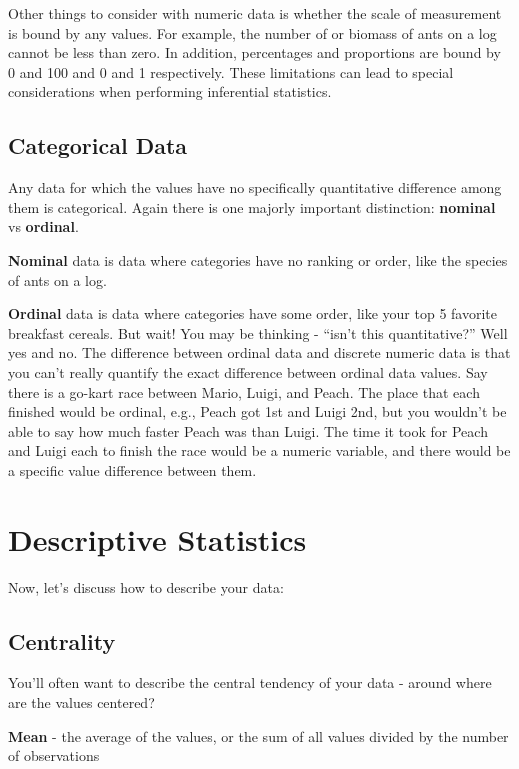 \documentclass[
  letterpaper,
  DIV=11,
  numbers=noendperiod]{scrreprt}
\begin{document}
Other things to consider with numeric data is whether the scale of
measurement is bound by any values. For example, the number of or
biomass of ants on a log cannot be less than zero. In addition,
percentages and proportions are bound by 0 and 100 and 0 and 1
respectively. These limitations can lead to special considerations when
performing inferential statistics.

\section{Categorical Data}\label{categorical-data}

Any data for which the values have no specifically quantitative
difference among them is categorical. Again there is one majorly
important distinction: \textbf{nominal} vs \textbf{ordinal}.

\textbf{Nominal} data is data where categories have no ranking or order,
like the species of ants on a log.

\textbf{Ordinal} data is data where categories have some order, like
your top 5 favorite breakfast cereals. But wait! You may be thinking -
``isn't this quantitative?'' Well yes and no. The difference between
ordinal data and discrete numeric data is that you can't really quantify
the exact difference between ordinal data values. Say there is a go-kart
race between Mario, Luigi, and Peach. The place that each finished would
be ordinal, e.g., Peach got 1st and Luigi 2nd, but you wouldn't be able
to say how much faster Peach was than Luigi. The time it took for Peach
and Luigi each to finish the race would be a numeric variable, and there
would be a specific value difference between them.

\chapter{Descriptive Statistics}\label{descriptive-statistics}

Now, let's discuss how to describe your data:

\section{Centrality}\label{centrality}

You'll often want to describe the central tendency of your data - around
where are the values centered?

\textbf{Mean} - the average of the values, or the sum of all values
divided by the number of observations
\end{document}
